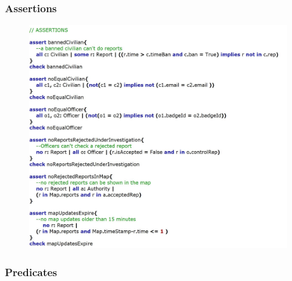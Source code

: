 \documentclass[12pt,a4paper]{article}
\begin{document}
\subsubsection{Assertions}

\begin{figure}[H]
\begin{adjustwidth}{-25mm}{-25mm}
				\centering
				\includegraphics[width=.75\paperwidth,height=.75\paperheight, keepaspectratio]{Images/Alloy/asserts}
\end{adjustwidth}
\end{figure}

\subsubsection{Predicates}
\end{document}
